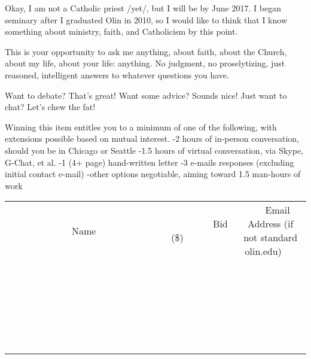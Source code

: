 \documentclass[11pt]{article}
\begin{document}
Okay, I am not a Catholic priest /yet/, but I will be by June 2017. I began seminary after I graduated Olin in 2010, so I would like to think that I know something about ministry, faith, and Catholicism by this point.

This is your opportunity to ask me anything, about faith, about the Church, about my life, about your life: anything. No judgment, no proselytizing, just reasoned, intelligent answers to whatever questions you have.

Want to debate? That's great! Want some advice? Sounds nice! Just want to chat? Let's chew the fat!

Winning this item entitles you to a minimum of one of the following, with extensions possible based on mutual interest.
-2 hours of in-person conversation, should you be in Chicago or Seattle
-1.5 hours of virtual conversation, via Skype, G-Chat, et al.
-1 (4+ page) hand-written letter
-3 e-mails responses (excluding initial contact e-mail)
-other options negotiable, aiming toward 1.5 man-hours of work
\\[6ex]
\begin{tabular}{c c c}
~~~~~~~~~~~~~Name~~~~~~~~~~~~~ & ~~~~~~~~~Bid (\$)~~~~~~~~~  & ~~~Email Address (if not standard olin.edu)~~~\\
 & & \\
\hline
 & & \\
\hline
 & & \\
\hline
 & & \\
\hline
 & & \\
\hline
 & & \\
\hline
 & & \\
\hline
 & & \\
\hline
 & & \\
\hline
 & & \\
\hline
 & & \\
\hline
 & & \\
\hline
 & & \\
\hline
 & & \\
\hline
 & & \\
\hline
 & & \\
\hline
 & & \\
\hline
 & & \\
\hline
 & & \\
\hline
 & & \\
\hline
 & & \\
\hline
 & & \\
\hline
 & & \\
\hline
 & & \\
\hline
 & & \\
\hline
 & & \\
\hline
\end{tabular}
\newpage
\end{document}
